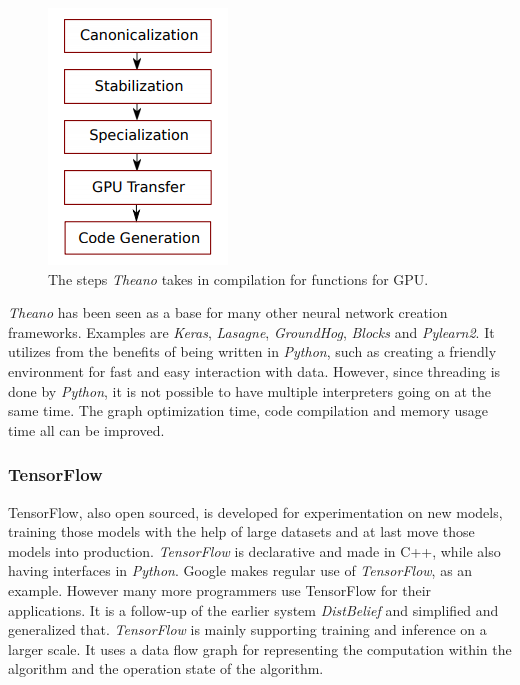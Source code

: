 \documentclass[10pt,a4paper]{report}
\begin{document}
	\begin{figure}[h!]
		\includegraphics{TheanoPipeline.PNG}
		\caption{The steps \textit{Theano} takes in compilation for functions for GPU. 
			 \cite{bergstra2010theano}}
		\label{fig:TheanoPipe}
	\end{figure}
	
	\textit{Theano} has been seen as a base for many other neural network creation 
	frameworks. Examples are \textit{Keras}, \textit{Lasagne}, \textit{GroundHog}, \textit{Blocks} and \textit{Pylearn2}. It 
	utilizes from the benefits of being written in \textit{Python}, such as creating a 
	friendly environment for fast and easy interaction with data. However, since 
	threading is done by \textit{Python}, it is not possible to have multiple 
	interpreters going on at the same time. The graph optimization time, code 
	compilation and memory usage time all can be improved.  \cite{al2016theano}
	
	\subsubsection{TensorFlow}
	
	TensorFlow, also open sourced, is developed for experimentation on new 
	models, training those models with the help of large datasets and at last 
	move those models into production. \cite{abadi2016tensorflow} \textit{TensorFlow} 
	is 
	declarative and made in C++, while also having interfaces in \textit{Python}. 
	 \cite{rampasek2016tensorflow} Google makes regular use of \textit{TensorFlow}, 
	as an example. However many more programmers use TensorFlow for their 
	applications. It is a follow-up of the earlier system \textit{DistBelief} and 
	simplified and generalized that. \textit{TensorFlow} is mainly supporting training 
	and inference on a larger scale. It uses a data flow graph for representing 
	the computation within the algorithm and the operation state of the 
	algorithm.  \cite{abadi2016tensorflow}
	
\end{document}
